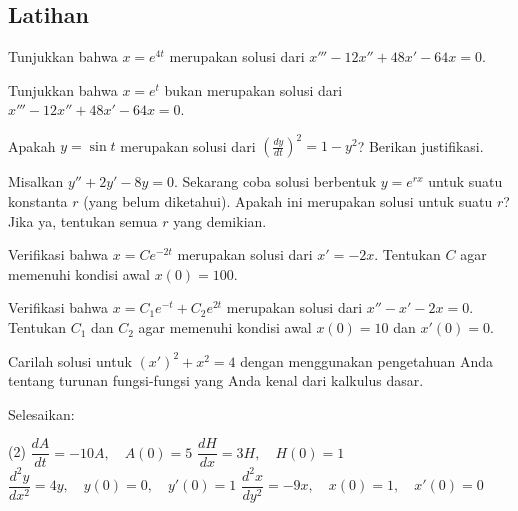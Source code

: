 \subsection{Latihan}

\begin{exercise}
Tunjukkan bahwa $x = e^{4t}$ merupakan solusi dari $x'''-12 x'' + 48 x' - 64 x = 0$.
\end{exercise}

\begin{exercise}
Tunjukkan bahwa $x = e^{t}$ bukan merupakan solusi dari $x'''-12 x'' + 48 x' - 64 x = 0$.
\end{exercise}

\begin{exercise}
Apakah $y = \sin t$ merupakan solusi dari ${\left( \frac{dy}{dt} \right)}^2 = 1 - y^2$?
Berikan justifikasi.
\end{exercise}

\begin{exercise}
Misalkan $y'' + 2y' - 8y = 0$. Sekarang coba solusi berbentuk $y = e^{rx}$ untuk
suatu konstanta $r$ (yang belum diketahui). Apakah ini merupakan solusi
untuk suatu $r$? Jika ya, tentukan semua $r$ yang demikian.
\end{exercise}

\begin{exercise}
Verifikasi bahwa $x = C e^{-2t}$ merupakan solusi dari $x' = -2x$.
Tentukan $C$ agar memenuhi kondisi awal $x(0) = 100$.
\end{exercise}

\begin{exercise}
Verifikasi bahwa $x = C_1 e^{-t} + C_2 e^{2t}$ merupakan solusi dari $x'' - x' -2 x =
0$. Tentukan $C_1$ dan $C_2$ agar memenuhi kondisi awal $x(0) = 10$
dan $x'(0) = 0$.
\end{exercise}

\begin{exercise}
Carilah solusi untuk
${(x')}^2 + x^2 = 4$
dengan menggunakan pengetahuan Anda tentang turunan fungsi-fungsi yang
Anda kenal dari kalkulus dasar.
\end{exercise}

\begin{exercise}
Selesaikan:
\begin{tasks}(2)
\task $\dfrac{dA}{dt} = -10 A, \quad A(0)=5$
\task $\dfrac{dH}{dx} = 3 H, \quad H(0)=1$
\task $\dfrac{d^2y}{dx^2} = 4 y, \quad y(0)=0, \quad y'(0)=1$
\task $\dfrac{d^2x}{dy^2} = -9 x, \quad x(0)=1, \quad x'(0)=0$
\end{tasks}
\end{exercise}


